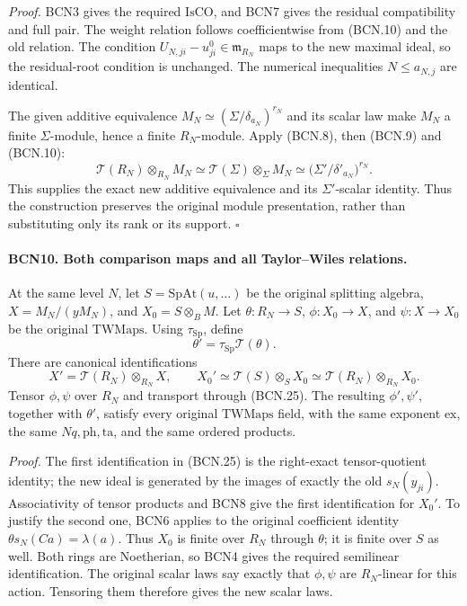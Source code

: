 \emph{Proof.}
BCN3 gives the required \(\mathrm{IsCO}\), and BCN7 gives
the residual compatibility and full pair.
The weight relation follows coefficientwise from (BCN.10)
and the old relation.  The condition
\(U_{N,ji}-u^0_{ji}\in\mathfrak m_{R_N}\) maps to the new
maximal ideal, so the residual-root condition is unchanged.
The numerical inequalities \(N\le a_{N,j}\) are identical.

The given additive equivalence
\(M_N\simeq(\Sigma/\delta_{a_N})^{r_N}\) and its scalar law
make \(M_N\) a finite \(\Sigma\)-module, hence a finite
\(R_N\)-module.  Apply (BCN.8), then (BCN.9) and (BCN.10):
\[
 \mathscr T(R_N)\otimes_{R_N}M_N
 \simeq \mathscr T(\Sigma)\otimes_\Sigma M_N
 \simeq
 \big(\Sigma'/\delta'_{a_N}\big)^{r_N}.                          \tag{BCN.23}
\]
This supplies the exact new additive equivalence and its
\(\Sigma'\)-scalar identity.  Thus the construction preserves
the original module presentation, rather than substituting
only its rank or its support.
\hfill\(\square\)

\paragraph{BCN10. Both comparison maps and all Taylor--Wiles relations.}\label{claim:BCN10}
At the same level \(N\), let \(S=\mathrm{SpAt}(u,\ldots)\)
be the original splitting algebra, \(X=M_N/(yM_N)\), and
\(X_0=S\otimes_B M\).
Let
\(\theta:R_N\to S\), \(\phi:X_0\to X\), and
\(\psi:X\to X_0\) be the original \(\mathrm{TWMaps}\).
Using \(\tau_{\mathrm{Sp}}\), define
\[
 \theta'=\tau_{\mathrm{Sp}}\mathscr T(\theta).
                                                               \tag{BCN.24}
\]
There are canonical identifications
\[
 X'=\mathscr T(R_N)\otimes_{R_N}X,\qquad
 X_0'\simeq\mathscr T(S)\otimes_S X_0
       \simeq\mathscr T(R_N)\otimes_{R_N}X_0 .                  \tag{BCN.25}
\]
Tensor \(\phi,\psi\) over \(R_N\) and transport through
(BCN.25).  The resulting \(\phi',\psi'\), together with
\(\theta'\), satisfy every original \(\mathrm{TWMaps}\) field,
with the same exponent \(\mathrm{ex}\), the same
\(Nq,\mathrm{ph},\mathrm{ta}\), and the same ordered products.

\emph{Proof.}
The first identification in (BCN.25) is the right-exact
tensor-quotient identity; the new ideal is generated by
the images of exactly the old \(s_N(y_{ji})\).
Associativity of tensor products and BCN8 give the first
identification for \(X_0'\).  To justify the second one,
BCN6 applies to the original coefficient identity
\(\theta s_N(Ca)=\lambda(a)\).
Thus \(X_0\) is finite over \(R_N\) through \(\theta\);
it is finite over \(S\) as well.  Both rings are Noetherian,
so BCN4 gives the required semilinear identification.
The original scalar laws say exactly that \(\phi,\psi\)
are \(R_N\)-linear for this action.  Tensoring them therefore
gives the new scalar laws.

